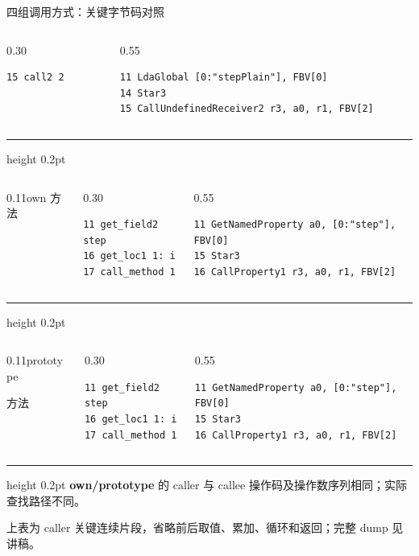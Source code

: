 \begin{frame}[fragile,t]{四组调用方式：关键字节码对照}
\begin{columns}[T,onlytextwidth]
\begin{column}{0.30\textwidth}
\begin{lstlisting}
15 call2 2
\end{lstlisting}
  \end{column}
  \begin{column}{0.55\textwidth}
\begin{lstlisting}
11 LdaGlobal [0:"stepPlain"], FBV[0]
14 Star3
15 CallUndefinedReceiver2 r3, a0, r1, FBV[2]
\end{lstlisting}
  \end{column}
\end{columns}
\par\vspace{3pt}\hrule height 0.2pt\vspace{3pt}
\begin{columns}[T,onlytextwidth]
  \begin{column}{0.11\textwidth}own 方法\end{column}
  \begin{column}{0.30\textwidth}
\begin{lstlisting}
11 get_field2 step
16 get_loc1 1: i
17 call_method 1
\end{lstlisting}
  \end{column}
  \begin{column}{0.55\textwidth}
\begin{lstlisting}
11 GetNamedProperty a0, [0:"step"], FBV[0]
15 Star3
16 CallProperty1 r3, a0, r1, FBV[2]
\end{lstlisting}
  \end{column}
\end{columns}
\par\vspace{3pt}\hrule height 0.2pt\vspace{3pt}
\begin{columns}[T,onlytextwidth]
  \begin{column}{0.11\textwidth}prototype\par 方法\end{column}
  \begin{column}{0.30\textwidth}
\begin{lstlisting}
11 get_field2 step
16 get_loc1 1: i
17 call_method 1
\end{lstlisting}
  \end{column}
  \begin{column}{0.55\textwidth}
\begin{lstlisting}
11 GetNamedProperty a0, [0:"step"], FBV[0]
15 Star3
16 CallProperty1 r3, a0, r1, FBV[2]
\end{lstlisting}
  \end{column}
\end{columns}
\par\vspace{3pt}\hrule height 0.2pt\vspace{4pt}
\fontsize{9}{10.5}\selectfont
\textbf{own/prototype} 的 caller 与 callee 操作码及操作数序列相同；实际查找路径不同。\par
上表为 caller 关键连续片段，省略前后取值、累加、循环和返回；完整 dump 见讲稿。
\endgroup
\end{frame}
